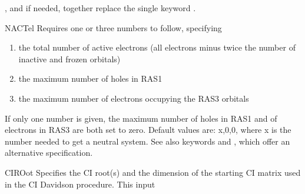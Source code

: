 \begin{keywordlist}
, and  if needed, together replace the single keyword
.
\item[NACTel]
Requires one or three numbers to follow, specifying
\begin{enumerate}
\item the total number of active electrons
(all electrons minus twice the number of inactive and frozen orbitals)
\item the maximum number of holes in RAS1
\item the maximum number of electrons occupying the RAS3 orbitals
\end{enumerate}
If only one number is given, the maximum number of holes in RAS1 and of electrons in RAS3 are both set to zero.
Default values are: x,0,0, where x is the number needed to get a neutral system.
See also keywords  and , which offer an alternative specification.
\item[CIROot]
Specifies the CI root(s) and the dimension of
the starting CI matrix used in the CI Davidson procedure. This input

\end{keywordlist}
